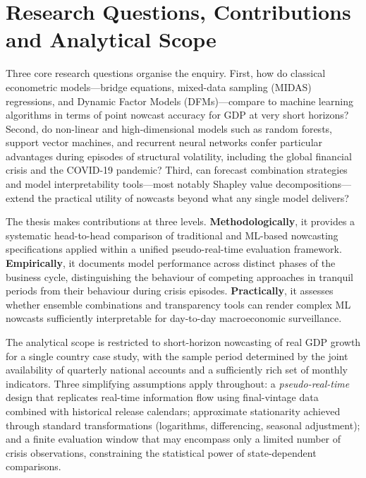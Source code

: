 \documentclass[12pt,a4paper]{report}
\begin{document}
\section{Research Questions, Contributions and Analytical Scope}

Three core research questions organise the enquiry. First, how do
classical econometric models---bridge equations, mixed-data sampling
(MIDAS) regressions, and Dynamic Factor Models (DFMs)---compare to
machine learning algorithms in terms of point nowcast accuracy for GDP
at very short horizons? Second, do non-linear and high-dimensional
models such as random forests, support vector machines, and recurrent
neural networks confer particular advantages during episodes of
structural volatility, including the global financial crisis and the
COVID-19 pandemic? Third, can forecast combination strategies and model
interpretability tools---most notably Shapley value
decompositions---extend the practical utility of nowcasts beyond what
any single model delivers?\citep{NetherlandsDNB2022}

The thesis makes contributions at three levels.
\textbf{Methodologically}, it provides a systematic head-to-head
comparison of traditional and ML-based nowcasting specifications applied
within a unified pseudo-real-time evaluation framework.
\textbf{Empirically}, it documents model performance across distinct
phases of the business cycle, distinguishing the behaviour of competing
approaches in tranquil periods from their behaviour during crisis
episodes. \textbf{Practically}, it assesses whether ensemble
combinations and transparency tools can render complex ML nowcasts
sufficiently interpretable for day-to-day macroeconomic surveillance.

The analytical scope is restricted to short-horizon nowcasting of real
GDP growth for a single country case study, with the sample period
determined by the joint availability of quarterly national accounts and
a sufficiently rich set of monthly indicators. Three simplifying
assumptions apply throughout: a \textit{pseudo-real-time} design that
replicates real-time information flow using final-vintage data combined
with historical release calendars; approximate stationarity achieved
through standard transformations (logarithms, differencing, seasonal
adjustment); and a finite evaluation window that may encompass only a
limited number of crisis observations, constraining the statistical
power of state-dependent comparisons.

\end{document}
